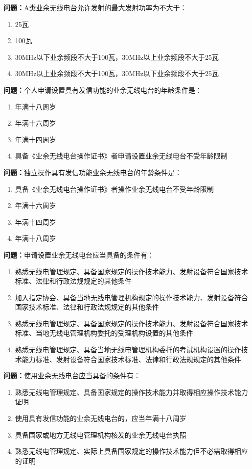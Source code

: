 \textbf{问题：}A类业余无线电台允许发射的最大发射功率为不大于：
\begin{enumerate}[label=\Alph*), leftmargin=3em]
	\item 25瓦
	\item 100瓦
	\item 30MHz以下业余频段不大于100瓦，30MHz以上业余频段不大于25瓦
	\item 30MHz以上业余频段不大于100瓦，30MHz以下业余频段不大于25瓦
\end{enumerate}

\textbf{问题：}个人申请设置具有发信功能的业余无线电台的年龄条件是：
\begin{enumerate}[label=\Alph*), leftmargin=3em]
	\item 年满十八周岁
	\item 年满十六周岁
	\item 年满十四周岁
	\item 具备《业余无线电台操作证书》者申请设置业余无线电台不受年龄限制
\end{enumerate}

\textbf{问题：}独立操作具有发信功能业余无线电台的年龄条件是：
\begin{enumerate}[label=\Alph*), leftmargin=3em]
	\item 具备《业余无线电台操作证书》者操作业余无线电台不受年龄限制
	\item 年满十六周岁
	\item 年满十四周岁
	\item 年满十八周岁
\end{enumerate}

\textbf{问题：}申请设置业余无线电台应当具备的条件有：
\begin{enumerate}[label=\Alph*), leftmargin=3em]
	\item 熟悉无线电管理规定、具备国家规定的操作技术能力、发射设备符合国家技术标准、法律和行政法规规定的其他条件
	\item 加入指定协会、具备当地无线电管理机构规定的操作技术能力、发射设备符合国家技术标准、法律和行政法规规定的其他条件
	\item 熟悉无线电管理规定、具备国家规定的操作技术能力、发射设备符合国家技术标准、当地无线电管理机构委托的受理机构设置的其他条件
	\item 熟悉无线电管理规定、具备当地无线电管理机构委托的考试机构设置的操作技术能力标准、发射设备符合国家技术标准、法律和行政法规规定的其他条件
\end{enumerate}

\textbf{问题：}使用业余无线电台应当具备的条件有：
\begin{enumerate}[label=\Alph*), leftmargin=3em]
	\item 熟悉无线电管理规定、具备国家规定的操作技术能力并取得相应操作技术能力证明
	\item 使用具有发信功能的业余无线电台的，应当年满十八周岁
	\item 具备国家或地方无线电管理机构核发的业余无线电台执照
	\item 熟悉无线电管理规定、实际上具备国家规定的操作技术能力但不必需取得相应的证明
\end{enumerate}

